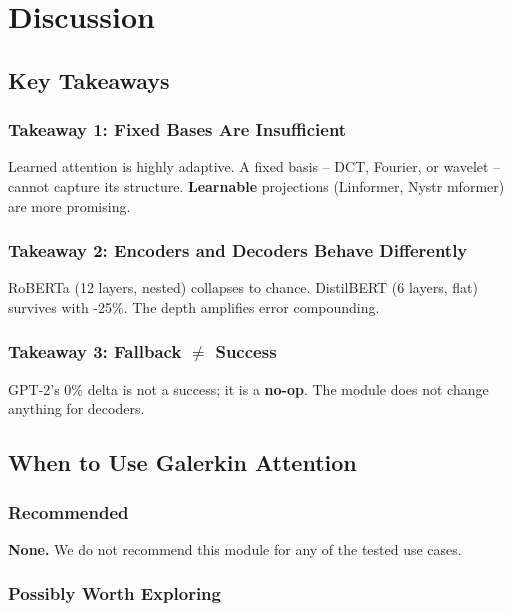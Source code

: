 
\section{Discussion}

\subsection{Key Takeaways}

\subsubsection{Takeaway 1: Fixed Bases Are Insufficient}

Learned attention is highly adaptive. A fixed basis -- DCT, Fourier, or 
wavelet -- cannot capture its structure. \textbf{Learnable} projections 
(Linformer, Nystr mformer) are more promising.

\subsubsection{Takeaway 2: Encoders and Decoders Behave Differently}

RoBERTa (12 layers, nested) collapses to chance. DistilBERT (6 layers, 
flat) survives with -25\%. The depth amplifies error compounding.

\subsubsection{Takeaway 3: Fallback $\ne$ Success}

GPT-2's 0\% delta is not a success; it is a \textbf{no-op}. The module does not 
change anything for decoders.

\subsection{When to Use Galerkin Attention}

\subsubsection{Recommended}

\textbf{None.} We do not recommend this module for any of the tested use cases.

\subsubsection{Possibly Worth Exploring}

